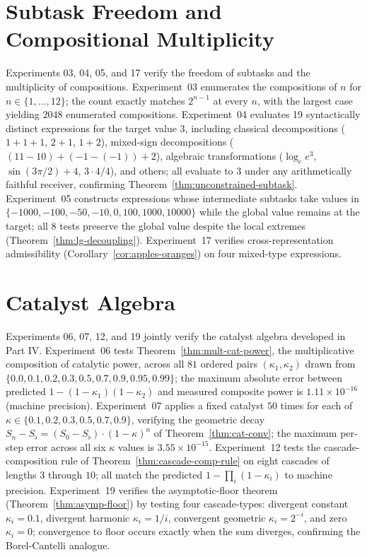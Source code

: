 \documentclass[twocolumn,11pt,a4paper]{article}
\theoremstyle{thmstyle}
\theoremstyle{thmstyle}
\theoremstyle{definition}
\theoremstyle{remark}
\begin{document}
\section{Subtask Freedom and Compositional Multiplicity}
\label{sec:val-subtask}

Experiments 03, 04, 05, and 17 verify the freedom
of subtasks and the multiplicity of compositions.
Experiment~03 enumerates the compositions of $n$
for $n \in \{1, \ldots, 12\}$; the count exactly
matches $2^{n-1}$ at every $n$, with the largest
case yielding $2048$ enumerated compositions.
Experiment~04 evaluates 19 syntactically distinct
expressions for the target value $3$, including
classical decompositions ($1+1+1$, $2+1$, $1+2$),
mixed-sign decompositions ($(11-10)+(-1-(-1))+2$),
algebraic transformations ($\log_e e^3$, $\sin(3\pi/2)+4$,
$3 \cdot 4/4$), and others; all evaluate to $3$
under any arithmetically faithful receiver,
confirming Theorem~\ref{thm:unconstrained-subtask}.
Experiment~05 constructs expressions whose
intermediate subtasks take values in
$\{-1000, -100, -50, -10, 0, 100, 1000, 10000\}$
while the global value remains at the target;
all $8$ tests preserve the global value despite
the local extremes (Theorem~\ref{thm:lg-decoupling}).
Experiment~17 verifies cross-representation
admissibility (Corollary~\ref{cor:apples-oranges})
on four mixed-type expressions.



\section{Catalyst Algebra}
\label{sec:val-catalyst}

Experiments 06, 07, 12, and 19 jointly verify the
catalyst algebra developed in Part IV.
Experiment~06 tests
Theorem~\ref{thm:mult-cat-power}, the
multiplicative composition of catalytic power,
across all $81$ ordered pairs $(\kappa_1, \kappa_2)$
drawn from
$\{0.0, 0.1, 0.2, 0.3, 0.5, 0.7, 0.9, 0.95, 0.99\}$;
the maximum absolute error between predicted
$1 - (1-\kappa_1)(1-\kappa_2)$ and measured
composite power is $1.11 \times 10^{-16}$
(machine precision).
Experiment~07 applies a fixed catalyst $50$ times
for each of $\kappa \in \{0.1, 0.2, 0.3, 0.5, 0.7,
0.9\}$, verifying the geometric decay
$S_n - S_\flat = (S_0 - S_\flat) \cdot (1-\kappa)^n$
of Theorem~\ref{thm:cat-conv}; the maximum
per-step error across all six $\kappa$ values is
$3.55 \times 10^{-15}$.
Experiment~12 tests the cascade-composition rule
of Theorem~\ref{thm:cascade-comp-rule} on eight
cascades of lengths $3$ through $10$;
all match the predicted
$1 - \prod_i (1 - \kappa_i)$ to machine precision.
Experiment~19 verifies the asymptotic-floor
theorem (Theorem~\ref{thm:asymp-floor}) by testing
four cascade-types: divergent constant
$\kappa_i = 0.1$, divergent harmonic $\kappa_i = 1/i$,
convergent geometric $\kappa_i = 2^{-i}$, and
zero $\kappa_i = 0$; convergence to floor occurs
exactly when the sum diverges, confirming the
Borel-Cantelli analogue.
\end{document}
